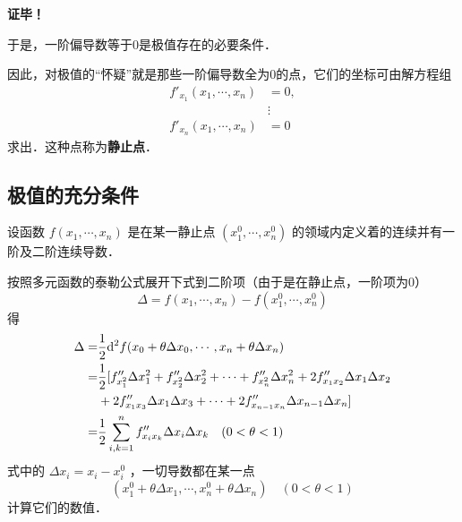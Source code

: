 \textbf{证毕！}

于是，一阶偏导数等于0是极值存在的必要条件．

因此，对极值的“怀疑”就是那些一阶偏导数全为0的点，它们的坐标可由解方程组
\begin{equation}
\begin{aligned}
f'_{x_1}(x_1,\cdots,x_n)&=0,\\
&\vdots\\
f'_{x_n}(x_1,\cdots,x_n)&=0
\end{aligned}
\end{equation}
求出．这种点称为\textbf{静止点}．
\subsection{极值的充分条件}
设函数 $f(x_1,\cdots,x_n)$ 是在某一静止点 $(x_1^0,\cdots,x_n^0)$ 的领域内定义着的连续并有一阶及二阶连续导数．
\begin{issues}
\end{issues}
按照多元函数的泰勒公式展开下式到二阶项（由于是在静止点，一阶项为0）
\begin{equation}
\Delta=f(x_1,\cdots,x_n)-f(x_1^0,\cdots,x_n^0)
\end{equation}
得
\begin{equation}
\begin{aligned}
\Delta=&\frac{1}{2}\mathrm{d}^2 f(x_0+\theta\Delta x_0,\cdots,x_n+\theta\Delta x_n)\\
=&\frac{1}{2}[f''_{x_1^2}\Delta x_1^2+f''_{x_2^2}\Delta x_2^2+\cdots+f''_{x_n^2}\Delta x_n^2+2f''_{x_1x_2}\Delta x_1\Delta x_2\\
&+2f''_{x_1x_3}\Delta x_1\Delta x_3+\cdots+2f''_{x_{n-1}x_n}\Delta x_{n-1}\Delta x_n\large]
 \\
 =&\frac{1}{2}\sum_{i,k=1}^nf''_{x_ix_k}\Delta x_i\Delta x_k \quad (0<\theta<1)
\end{aligned}
\end{equation}
式中的 $\Delta x_i=x_i-x_i^0$ ，一切导数都在某一点
\begin{equation}
(x_1^0+\theta\Delta x_1,\cdots,x_n^0+\theta\Delta x_n) \quad (0<\theta<1)
\end{equation}
计算它们的数值．

